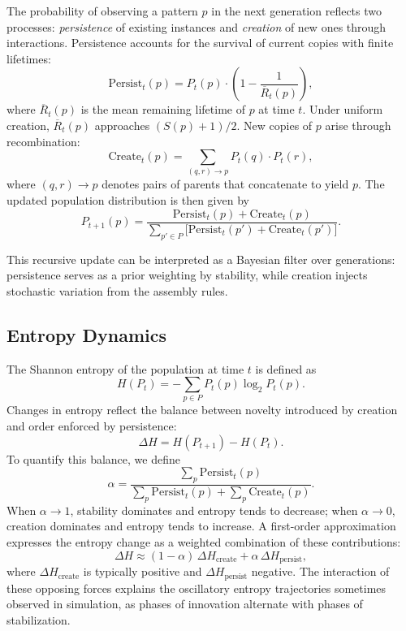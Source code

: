\documentclass[life,article,submit,pdftex,moreauthors]{Definitions/mdpi}
\begin{document}
The probability of observing a pattern $p$ in the next generation reflects two processes: 
\textit{persistence} of existing instances and \textit{creation} of new ones through interactions. 
Persistence accounts for the survival of current copies with finite lifetimes:
\begin{equation}
\label{eq:persist-term}
\mathrm{Persist}_t(p) = P_t(p) \cdot \left(1 - \frac{1}{\overline{R}_t(p)}\right),
\end{equation}
where $\overline{R}_t(p)$ is the mean remaining lifetime of $p$ at time $t$. 
Under uniform creation, $\overline{R}_t(p)$ approaches $(S(p)+1)/2$.  New copies of $p$ arise through recombination:
\begin{equation}
\label{eq:create-term}
\mathrm{Create}_t(p) = \sum_{(q,r) \to p} P_t(q) \cdot P_t(r),
\end{equation}
where $(q,r) \to p$ denotes pairs of parents that concatenate to yield $p$. The updated population distribution is then given by
\begin{equation}
\label{eq:full-ba-update}
P_{t+1}(p) = \frac{\mathrm{Persist}_t(p) + \mathrm{Create}_t(p)}
{\sum_{p' \in P} \big[\mathrm{Persist}_t(p') + \mathrm{Create}_t(p')\big]}.
\end{equation}

This recursive update can be interpreted as a Bayesian filter over generations: persistence serves as a prior weighting by stability, while creation injects stochastic variation from the assembly rules. 

\subsection{Entropy Dynamics}

The Shannon entropy of the population at time $t$ is defined as
\begin{equation}
H(P_t) = - \sum_{p \in P} P_t(p) \log_2 P_t(p).
\end{equation}
Changes in entropy reflect the balance between novelty introduced by creation and order enforced by persistence:
\begin{equation}
\Delta H = H(P_{t+1}) - H(P_t).
\end{equation}
To quantify this balance, we define
\begin{equation}
\alpha = \frac{\sum_p \mathrm{Persist}_t(p)}
{\sum_p \mathrm{Persist}_t(p) + \sum_p \mathrm{Create}_t(p)}.
\end{equation}
When $\alpha \to 1$, stability dominates and entropy tends to decrease; when $\alpha \to 0$, creation dominates and entropy tends to increase.  
A first-order approximation expresses the entropy change as a weighted combination of these contributions:
\begin{equation}
\Delta H \approx (1 - \alpha)\,\Delta H_{\text{create}} + \alpha\,\Delta H_{\text{persist}},
\end{equation}
where $\Delta H_{\text{create}}$ is typically positive and $\Delta H_{\text{persist}}$ negative.  The interaction of these opposing forces explains the oscillatory entropy trajectories sometimes observed in simulation, as phases of innovation alternate with phases of stabilization.
\end{document}
